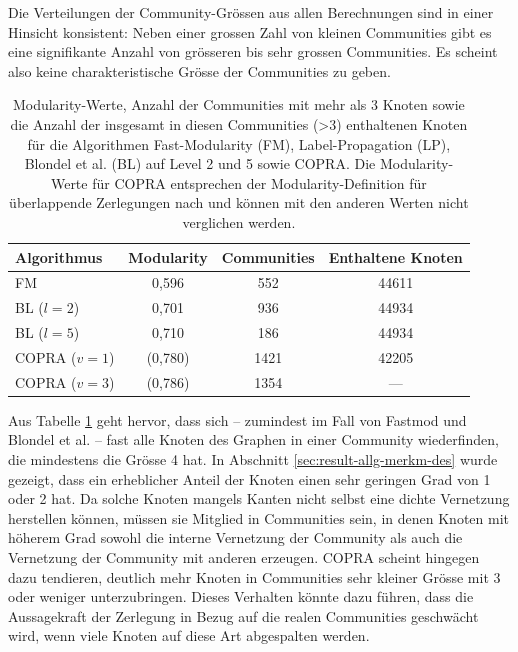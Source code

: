 Die Verteilungen der Community-Gr\"ossen aus allen Berechnungen sind
in einer Hinsicht konsistent: Neben einer grossen Zahl von kleinen
Communities gibt es eine signifikante Anzahl von gr\"osseren bis sehr
grossen Communities. Es scheint also keine charakteristische Gr\"osse
der Communities zu geben.

\begin{table}[t]
  \centering
  \footnotesize
  \begin{tabular}{l|c|c|c}
    Algorithmus & Modularity & Communities &
    Enthaltene Knoten \\
    \hline
    FM & 0,596 & 552 & 44611 \\
    \hline
    BL ($l=2$)& 0,701 & 936 & 44934 \\
    BL ($l=5$)& 0,710 & 186 & 44934 \\
    \hline
    COPRA ($v=1$) & (0,780) & 1421 & 42205 \\
    COPRA ($v=3$) & (0,786) & 1354 & --- \\

  \end{tabular}
  \caption{Modularity-Werte, Anzahl der Communities mit mehr als 3
    Knoten sowie die Anzahl der insgesamt in diesen Communities (>3) enthaltenen
    Knoten 
    f\"ur die Algorithmen Fast-Modularity (FM), Label-Propagation
    (LP), Blondel et al. (BL) auf Level 2 und 5 sowie COPRA. Die
    Modularity-Werte f\"ur COPRA entsprechen der Modularity-Definition
    f\"ur \"uberlappende Zerlegungen nach \cite{Nicosia2009} und k\"onnen mit den anderen
    Werten nicht verglichen werden.}
  \label{tab:mod-result}
\end{table}

Aus Tabelle \ref{tab:mod-result} geht hervor, dass sich -- zumindest
im Fall von Fastmod und Blondel et al. -- fast alle Knoten des Graphen
in einer Community wiederfinden, die mindestens die Gr\"osse 4 hat. In
Abschnitt \ref{sec:result-allg-merkm-des} wurde gezeigt, dass ein
erheblicher Anteil der Knoten einen sehr geringen Grad von 1 oder 2
hat. Da solche Knoten mangels Kanten nicht selbst eine dichte
Vernetzung herstellen k\"onnen, m\"ussen sie Mitglied in Communities
sein, in denen Knoten mit h\"oherem Grad sowohl die interne Vernetzung
der Community als auch die Vernetzung der Community mit anderen
erzeugen. COPRA scheint hingegen dazu tendieren, deutlich mehr Knoten
in Communities sehr kleiner Gr\"osse mit 3 oder weniger
unterzubringen. Dieses Verhalten k\"onnte dazu f\"uhren, dass die
Aussagekraft der Zerlegung in Bezug auf die realen Communities
geschw\"acht wird, wenn viele Knoten auf diese Art abgespalten werden.

